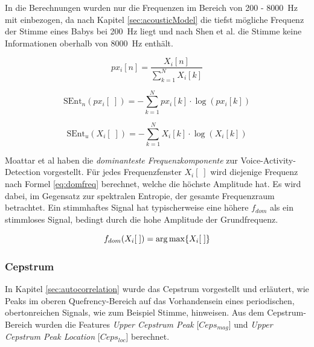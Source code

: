 In die Berechnungen wurden nur die Frequenzen im Bereich von 200 - \SI{8000}{\hertz} mit einbezogen, da nach Kapitel \ref{sec:acousticModel} die tiefst mögliche Frequenz der Stimme eines Babys bei \SI{200}{\hertz} liegt und nach Shen et al. \cite{vad_entropie02} die Stimme keine Informationen oberhalb von \SI{8000}{\hertz} enthält.

\begin{equation}
px_i[n] = \frac{X_i[n]}{\sum_{k=1}^{N} X_i[k]}
\label{eq:norm_spek}
\end{equation}

\begin{equation}
\text{SEnt}_n(px_i[\;]) = -\sum_{k=1}^{N}px_i[k] \cdot\log(px_i[k])
\label{eq:norm_se}
\end{equation}

\begin{equation}
\text{SEnt}_u(X_i[\;]) = -\sum_{k=1}^{N}X_i[k] \cdot\log(X_i[k])
\label{eq:unnnorm_se}
\end{equation}

Moattar et al \cite[S. 2550]{vad_Easy} haben die \emph{dominanteste Frequenzkomponente} zur Voice-Activity-Detection vorgestellt. Für jedes Frequenzfenster $X_i[\;]$ wird diejenige Frequenz nach Formel \ref{eq:domfreq} berechnet, welche die höchste Amplitude hat. Es wird dabei, im Gegensatz zur spektralen Entropie, der gesamte Frequenzraum betrachtet. Ein stimmhaftes Signal hat typischerweise eine höhere $f_{dom}$ als ein stimmloses Signal, bedingt durch die hohe Amplitude der Grundfrequenz.

\begin{equation}
f_{dom}(X_i[\;]) = \operatorname*{arg\,max} \{X_i[\;]\}
\label{eq:domfreq}
\end{equation}


\subsubsection{Cepstrum}
\label{sec:cepstrum-feature}

In Kapitel \ref{sec:autocorrelation} wurde das Cepstrum vorgestellt und erläutert, wie Peaks im oberen Quefrency-Bereich auf das Vorhandensein eines periodischen, obertonreichen Signals, wie zum Beispiel Stimme, hinweisen. Aus dem Cepstrum-Bereich wurden die Features \emph{Upper Cepstrum Peak} [$Ceps_{mag}$] und \emph{Upper Cepstrum Peak Location} [$Ceps_{loc}$] berechnet.

